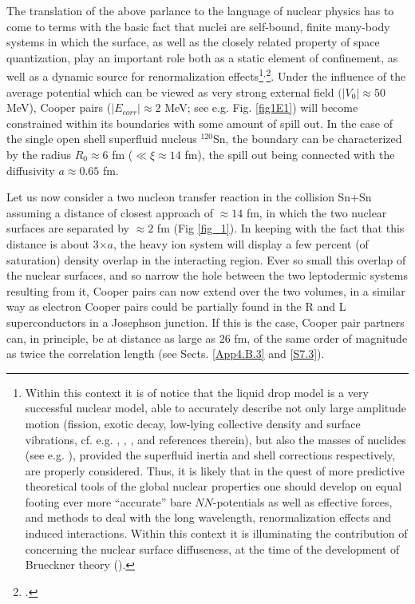 The translation of the above parlance to the language of nuclear physics has to come to terms with the basic fact that nuclei are self-bound, finite many-body systems in which the surface, as well as the closely related property of space quantization, play an important role both as a static element of confinement, as well as a dynamic source for renormalization effects\footnote{Within this context it is of notice that the liquid drop model is a very successful nuclear model, able to accurately describe not only large amplitude motion (fission, exotic decay, low-lying collective density and surface vibrations, cf. e.g. \cite{Bohr:39}, \cite{Bertsch:88b}, \cite{Barranco:90}, and references therein), but also the masses of nuclides (see e.g. \cite{Moller:95}), provided the superfluid inertia and shell corrections respectively, are properly considered. Thus, it is likely that in the quest of  more predictive theoretical tools of the global nuclear properties one should develop on equal footing ever more ``accurate'' bare $NN$-potentials as well as effective forces, and methods to deal with the long wavelength, renormalization effects and induced interactions. Within this context it is illuminating the contribution of \cite{Anderson:62} concerning the nuclear surface diffuseness, at the time of the development of  Brueckner theory (\cite{Brueckner:61}).}$^,$\footnote{\cite{Broglia:02d}.}.
Under the influence of the average potential which can be viewed as very strong external field $(|V_0|\approx 50$ MeV), Cooper pairs ($|E_{corr}|\approx 2$ MeV; see e.g. Fig. \ref{fig1E1}) will become constrained within its boundaries with some amount of spill out. In the case of the single open shell superfluid nucleus $^{120}$Sn, the boundary can be characterized by the radius $R_0\approx 6$ fm ($\ll \xi\approx 14$ fm), the spill out being connected with the diffusivity $a\approx 0.65$ fm. 


Let us now consider a two nucleon transfer reaction in the collision Sn+Sn assuming a distance of closest approach of $\approx 14$ fm, in which the two nuclear surfaces are separated by $\approx 2$ fm (Fig \ref{fig_1}). In keeping with the fact that this distance is about 3$\times a$, the heavy ion system will display a few percent (of saturation) density overlap in the interacting region. Ever so small this overlap of the nuclear surfaces, and so narrow the hole between the two leptodermic systems resulting from  it,  Cooper pairs can now extend over the two volumes, in a similar way as electron Cooper pairs could be partially found in the R and L superconductors in a Josephson junction. If this is the case, Cooper pair partners can, in principle, be at distance as large as 26 fm, of the same order of magnitude as twice the correlation length (see Sects. \ref{App4.B.3} and \ref{S7.3}). 


